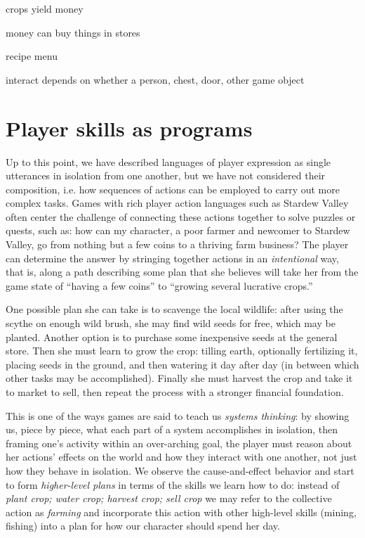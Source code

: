 \documentclass[sigconf]{acmart}
\begin{document}
crops yield money

money can buy things in stores

recipe menu

interact depends on whether a person, chest, door, other game object


\section{Player skills as programs}


Up to this point, we have described languages of player expression as
single utterances in isolation from one another, but we have not considered
their composition, i.e. how sequences of actions can be employed to carry out
more complex tasks. Games with rich player action languages such as Stardew
Valley often center the challenge of connecting these actions together to
solve puzzles or quests, such as: how can my character, a poor farmer and
newcomer to Stardew Valley, go from nothing but a few coins to a thriving
farm business? The player can determine the answer by stringing together
actions in an {\em intentional} way, that is, along a path describing some
plan that she believes will take her from the game state of ``having a
few coins'' to ``growing several lucrative crops.''

One possible plan she can take is to scavenge the local wildlife: after
using the scythe on enough wild brush, she may find wild seeds for free,
which may be planted. Another option is to purchase some inexpensive seeds
at the general store. Then she must learn to grow the crop: tilling earth,
optionally fertilizing it, placing seeds in the ground, and then watering
it day after day (in between which other tasks may be accomplished).
Finally she must harvest the crop and take it to market to sell, then
repeat the process with a stronger financial foundation.

This is one of the ways games are said to teach us {\em systems thinking}:
by showing us, piece by piece, what each part of a system accomplishes in
isolation, then framing one's activity within an over-arching goal, the
player must reason about her actions' effects on the world and how they
interact with one another, not just how they behave in isolation. We
observe the cause-and-effect behavior and start to form {\em higher-level
plans} in terms of the skills we learn how to do: instead of {\em plant
crop; water crop; harvest crop; sell crop} we may refer to the collective
action as {\em farming} and incorporate this action with other high-level
skills (mining, fishing) into a plan for how our character should spend her
day.
\end{document}

